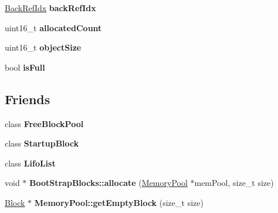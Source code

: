 \begin{DoxyCompactItemize}
\item 
\hypertarget{classrml_1_1internal_1_1LocalBlockFields_a11ce58dcddb3de047a57116d563d24ea}{}\hyperlink{classrml_1_1internal_1_1BackRefIdx}{Back\+Ref\+Idx} {\bfseries back\+Ref\+Idx}\label{classrml_1_1internal_1_1LocalBlockFields_a11ce58dcddb3de047a57116d563d24ea}

\item 
\hypertarget{classrml_1_1internal_1_1LocalBlockFields_a7d1d7c70675b3ba72924d1cbafd6772a}{}uint16\+\_\+t {\bfseries allocated\+Count}\label{classrml_1_1internal_1_1LocalBlockFields_a7d1d7c70675b3ba72924d1cbafd6772a}

\item 
\hypertarget{classrml_1_1internal_1_1LocalBlockFields_a0e116178c7df6b87077b7b029a0fe653}{}uint16\+\_\+t {\bfseries object\+Size}\label{classrml_1_1internal_1_1LocalBlockFields_a0e116178c7df6b87077b7b029a0fe653}

\item 
\hypertarget{classrml_1_1internal_1_1LocalBlockFields_a76d70cbe8837862cdf286a120266e430}{}bool {\bfseries is\+Full}\label{classrml_1_1internal_1_1LocalBlockFields_a76d70cbe8837862cdf286a120266e430}

\end{DoxyCompactItemize}
\subsection*{Friends}
\begin{DoxyCompactItemize}
\item 
\hypertarget{classrml_1_1internal_1_1LocalBlockFields_aab178c7b56f5dcfba20ccb6c19ca4304}{}class {\bfseries Free\+Block\+Pool}\label{classrml_1_1internal_1_1LocalBlockFields_aab178c7b56f5dcfba20ccb6c19ca4304}

\item 
\hypertarget{classrml_1_1internal_1_1LocalBlockFields_a9308a65d09141b30f2fec487c2a15828}{}class {\bfseries Startup\+Block}\label{classrml_1_1internal_1_1LocalBlockFields_a9308a65d09141b30f2fec487c2a15828}

\item 
\hypertarget{classrml_1_1internal_1_1LocalBlockFields_ada4f758cc14b38601bff2f737f50caca}{}class {\bfseries Lifo\+List}\label{classrml_1_1internal_1_1LocalBlockFields_ada4f758cc14b38601bff2f737f50caca}

\item 
\hypertarget{classrml_1_1internal_1_1LocalBlockFields_a9afb5b7f2317b9666f2d644493e9d67c}{}void $\ast$ {\bfseries Boot\+Strap\+Blocks\+::allocate} (\hyperlink{classrml_1_1internal_1_1MemoryPool}{Memory\+Pool} $\ast$mem\+Pool, size\+\_\+t size)\label{classrml_1_1internal_1_1LocalBlockFields_a9afb5b7f2317b9666f2d644493e9d67c}

\item 
\hypertarget{classrml_1_1internal_1_1LocalBlockFields_af82ff1554ffb7d99638064ad03b34bfc}{}\hyperlink{classrml_1_1internal_1_1Block}{Block} $\ast$ {\bfseries Memory\+Pool\+::get\+Empty\+Block} (size\+\_\+t size)\label{classrml_1_1internal_1_1LocalBlockFields_af82ff1554ffb7d99638064ad03b34bfc}

\end{DoxyCompactItemize}


